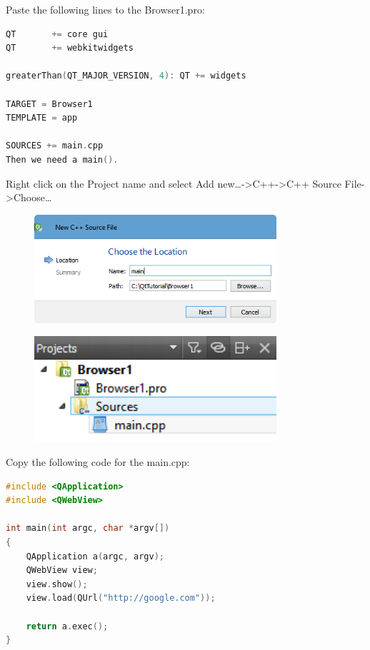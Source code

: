 Paste the following lines to the Browser1.pro:

\begin{lstlisting}[language=c++, numbers=none]
QT       += core gui
QT       += webkitwidgets

greaterThan(QT_MAJOR_VERSION, 4): QT += widgets

TARGET = Browser1
TEMPLATE = app

SOURCES += main.cpp
Then we need a main().
\end{lstlisting}

Right click on the Project name and select Add
new\ldots{}-\textgreater{}C++-\textgreater{}C++ Source
File-\textgreater{}Choose\ldots{}

\begin{figure}[htbp]
\centering
\includegraphics[width=0.8\textwidth]{images/main_cpp.png}
\caption{}
\end{figure}

\begin{figure}[htbp]
\centering
\includegraphics[width=0.8\textwidth]{images/Browser1_files.png}
\caption{}
\end{figure}

Copy the following code for the main.cpp:

\begin{lstlisting}[language=c++, numbers=none]
#include <QApplication>
#include <QWebView>

int main(int argc, char *argv[])
{
    QApplication a(argc, argv);
    QWebView view;
    view.show();
    view.load(QUrl("http://google.com"));

    return a.exec();
}
\end{lstlisting}

